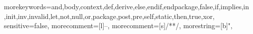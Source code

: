 {morekeywords={and,body,context,def,derive,else,endif,endpackage,false,if,implies,in,init,inv,invalid,let,not,null,or,package,post,pre,self,static,then,true,xor},
sensitive=false,
morecomment=[l]{--},
morecomment=[s]{/*}{*/},
morestring=[b]",
}
